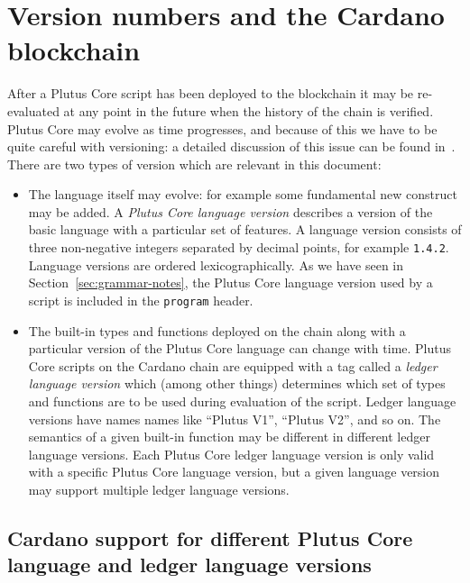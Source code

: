 \section{Version numbers and the Cardano blockchain}
\label{appendix:version-numbers}
After a Plutus Core script has been deployed to the blockchain it may be
re-evaluated at any point in the future when the history of the chain is
verified.  Plutus Core may evolve as time progresses, and because of this we
have to be quite careful with versioning: a detailed discussion of this issue
can be found in~\cite{CIP-35}.  There are two types of version which are
relevant in this document:

\begin{itemize}
\item The language itself may evolve: for example some fundamental new construct
  may be added.  A \textit{Plutus Core language version} describes a version of
  the basic language with a particular set of features. A language version
  consists of three non-negative integers separated by decimal points, for
  example \texttt{1.4.2}.  Language versions are ordered lexicographically.  As
  we have seen in Section~\ref{sec:grammar-notes}, the Plutus Core
  language version used by a script is included in the \texttt{program} header.
  
\item The built-in types and functions deployed on the chain along with a
  particular version of the Plutus Core language can change with time.  Plutus
  Core scripts on the Cardano chain are equipped with a tag called a
  \textit{ledger language version} which (among other things) determines which
  set of types and functions are to be used during evaluation of the script.
  Ledger language versions have names names like ``Plutus V1'', ``Plutus V2'',
  and so on.  The semantics of a given built-in function may be different in
  different ledger language versions.  Each Plutus Core ledger language version
  is only valid with a specific Plutus Core language version, but a given
  language version may support multiple ledger language versions.
\end{itemize}

\subsection{Cardano support for different Plutus Core language and ledger language versions}

